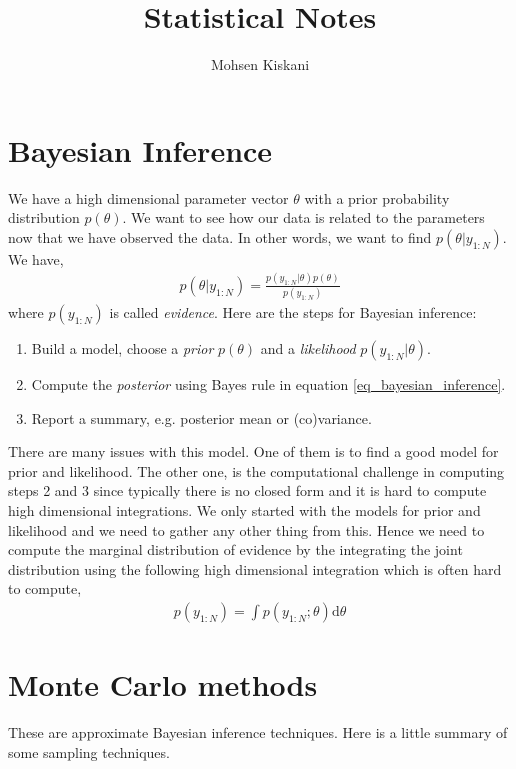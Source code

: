 \documentclass[10pt ]{article}
\begin{document}
\title{Statistical Notes}

\author{Mohsen Kiskani}

\maketitle


\section{Bayesian Inference}

We have a high dimensional parameter vector $\theta$ with a prior probability distribution $p(\theta)$. We want to see how our data is related to the parameters now that we have observed the data. In other words, we want to find $p(\theta | y_{1:N})$. We have,
\begin{align}
p(\theta | y_{1:N}) = \frac{ p(y_{1:N} | \theta) p(\theta)}{p(y_{1:N})}
\label{eq_bayesian_inference}
\end{align}
where $p(y_{1:N})$ is called {\em evidence}. Here are the steps for Bayesian inference:
\begin{enumerate}
\item Build a model, choose a {\em prior} $p(\theta)$ and a {\em likelihood} $p(y_{1:N} | \theta)$.
\item Compute the {\em posterior} using Bayes rule in equation \eqref{eq_bayesian_inference}.
\item Report a summary, e.g. posterior mean or (co)variance.
\end{enumerate}
There are many issues with this model. One of them is to find a good model for prior and likelihood. The other one, is the computational challenge in computing steps 2 and 3 since typically there is no closed form and it is hard to compute high dimensional integrations.
We only started with the models for prior and likelihood and we need to gather any other thing from this. Hence we need to compute the marginal distribution of evidence by the integrating the joint distribution using the following high dimensional integration which is often hard to compute,
\begin{align}
p(y_{1:N}) = \int p(y_{1:N} ; \theta) \mathrm{d}\theta
\label{eq_evidence}
\end{align}

\section{Monte Carlo methods}
These are approximate Bayesian inference techniques. Here is a little summary of some sampling techniques. 
\end{document}
